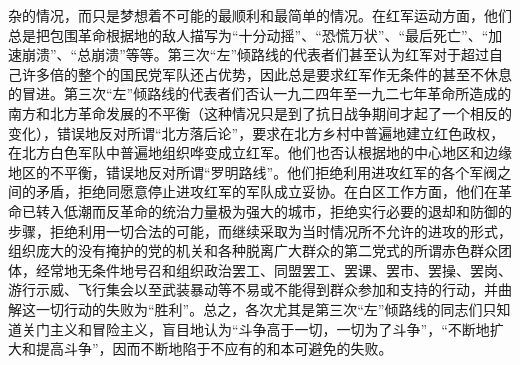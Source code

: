 杂的情况，而只是梦想着不可能的最顺利和最简单的情况。在红军运动方面，他们总是把包围革命根据地的敌人描写为“十分动摇”、“恐慌万状”、“最后死亡”、“加速崩溃”、“总崩溃”等等。第三次“左”倾路线的代表者们甚至认为红军对于超过自己许多倍的整个的国民党军队还占优势，因此总是要求红军作无条件的甚至不休息的冒进。第三次“左”倾路线的代表者们否认一九二四年至一九二七年革命所造成的南方和北方革命发展的不平衡（这种情况只是到了抗日战争期间才起了一个相反的变化），错误地反对所谓“北方落后论”，要求在北方乡村中普遍地建立红色政权，在北方白色军队中普遍地组织哗变成立红军。他们也否认根据地的中心地区和边缘地区的不平衡，错误地反对所谓“罗明路线”。他们拒绝利用进攻红军的各个军阀之间的矛盾，拒绝同愿意停止进攻红军的军队成立妥协。在白区工作方面，他们在革命已转入低潮而反革命的统治力量极为强大的城市，拒绝实行必要的退却和防御的步骤，拒绝利用一切合法的可能，而继续采取为当时情况所不允许的进攻的形式，组织庞大的没有掩护的党的机关和各种脱离广大群众的第二党式的所谓赤色群众团体，经常地无条件地号召和组织政治罢工、同盟罢工、罢课、罢市、罢操、罢岗、游行示威、飞行集会以至武装暴动等不易或不能得到群众参加和支持的行动，并曲解这一切行动的失败为“胜利”。总之，各次尤其是第三次“左”倾路线的同志们只知道关门主义和冒险主义，盲目地认为“斗争高于一切，一切为了斗争”，“不断地扩大和提高斗争”，因而不断地陷于不应有的和本可避免的失败。


